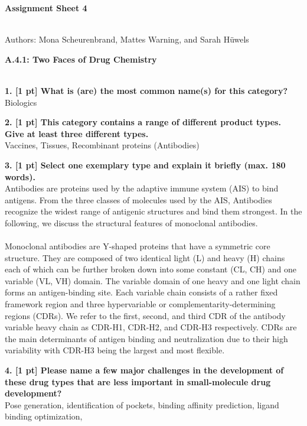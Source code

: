 \documentclass[a4paper,10pt]{article}
\begin{document}


\begin{huge}
	\vspace{1cm}
	\textbf{Assignment Sheet 4}
\end{huge} \\

Authors: Mona Scheurenbrand, Mattes Warning, and Sarah Hüwels


\begin{large}
	\vspace{1.0cm}
	\textbf{A.4.1: Two Faces of Drug Chemistry}
\end{large}	\\ [2mm]
\textbf{1. [1 pt] What is (are) the most common name(s) for this category?} \\
Biologics

\textbf{2. [1 pt] This category contains a range of diﬀerent product types. Give at least three diﬀerent types.} \\
Vaccines, Tissues, Recombinant proteins (Antibodies)

\textbf{3. [1 pt] Select one exemplary type and explain it briefly (max. 180 words).} \\
Antibodies are proteins used by the adaptive immune system (AIS) to bind antigens. From the three classes of molecules used by the AIS, Antibodies recognize the widest range of antigenic structures and bind them strongest. In the following, we discuss the structural features of monoclonal antibodies. \\ \\
Monoclonal antibodies are Y-shaped proteins that have a symmetric core structure. They are composed of two identical light (L) and heavy (H) chains each of which can be further broken down into some constant (CL, CH) and one variable (VL, VH) domain. The variable domain of one heavy and one light chain forms an antigen-binding site. Each variable chain consists of a rather fixed framework region and three hypervariable or complementarity-determining regions (CDRs). We refer to the first, second, and third CDR of the antibody variable heavy chain as CDR-H1, CDR-H2, and CDR-H3 respectively.  CDRs are the main determinants of antigen binding and neutralization due to their high variability with CDR-H3 being the largest and most flexible.

\textbf{4. [1 pt] Please name a few major challenges in the development of these drug types that are less important in
small-molecule drug development?} \\
Pose generation, identification of pockets, binding affinity prediction, ligand binding optimization,
\end{document}
